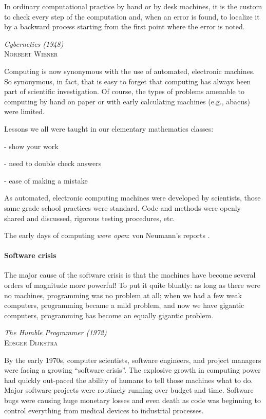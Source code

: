 \documentclass[ChapterTOCs,krantz2]{krantz} %
\begin{document}
\setlength{\epigraphrule}{0pt}
\setlength{\epigraphwidth}{.65\textwidth}
\epigraph%
{%
  In ordinary computational practice by hand or by desk machines, it
  is the custom to check every step of the computation and, when an
  error is found, to localize it by a backward process starting from
  the first point where the error is noted.
}%
{\textit{Cybernetics (1948)}\\ \textsc{Norbert Wiener} }

Computing is now synonymous with the use of automated, electronic machines.  So
synonymous, in fact, that is easy to forget that computing has always been part
of scientific investigation. Of course, the types of problems amenable to
computing by hand on paper or with early calculating machines (e.g., abacus)
were limited. 

Lessons we all were taught in our elementary mathematics classes:

- show your work

- need to double check answers

- ease of making a mistake

As automated, electronic computing machines were developed by scientists,
those same grade school practices were standard.  Code and methods were
openly shared and discussed, rigorous testing procedures, etc.

The early days of computing \emph{were open}: von Neumann's reports
\cite{grcar2011john}.

\paragraph{ {\bf Software crisis}}

\setlength{\epigraphrule}{0pt}
\setlength{\epigraphwidth}{.65\textwidth}
\epigraph%
{%
  The major cause of the software crisis is that the machines have become
  several orders of magnitude more powerful! To put it quite bluntly: as long
  as there were no machines, programming was no problem at all; when we had a
  few weak computers, programming became a mild problem, and now we have
  gigantic computers, programming has become an equally gigantic problem.
}%
{\textit{The Humble Programmer (1972)}\\ \textsc{Edsger Dijkstra} }

By the early 1970s, computer scientists, software engineers, and project
managers were facing a growing ``software crisis''. The explosive growth in
computing power had quickly out-paced the ability of humans to tell those machines
what to do. Major software projects were routinely running over budget and
time. Software bugs were causing huge monetary losses and even death as code
was beginning to control everything from medical devices to industrial processes.
\end{document}
